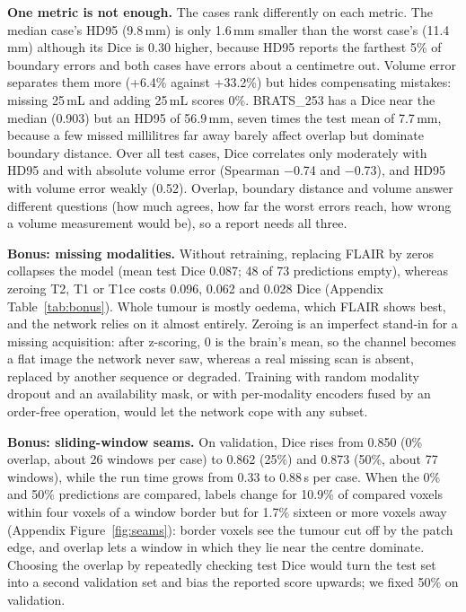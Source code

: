 \documentclass[11pt,a4paper]{article}
\begin{document}
\textbf{One metric is not enough.} The cases rank differently on each metric. The median case's HD95 (9.8\,mm) is only 1.6\,mm
smaller than the worst case's (11.4\,mm) although its Dice is 0.30 higher, because HD95 reports the farthest 5\% of
boundary errors and both cases have errors about a centimetre out. Volume error separates them more (+6.4\% against
+33.2\%) but hides compensating mistakes: missing 25\,mL and adding 25\,mL scores 0\%. BRATS\_253 has a Dice near the
median (0.903) but an HD95 of 56.9\,mm, seven times the test mean of 7.7\,mm, because a few missed millilitres far away
barely affect overlap but dominate boundary distance. Over all
test cases, Dice correlates only moderately with HD95 and with absolute volume error (Spearman $-$0.74 and $-$0.73), and
HD95 with volume error weakly (0.52). Overlap, boundary distance and volume answer different questions (how much agrees,
how far the worst errors reach, how wrong a volume measurement would be), so a report needs all three.

\textbf{Bonus: missing modalities.} Without retraining, replacing FLAIR by zeros collapses the model (mean test Dice
0.087; 48 of 73 predictions empty), whereas zeroing T2, T1 or T1ce costs 0.096, 0.062 and 0.028 Dice
(Appendix Table~\ref{tab:bonus}). Whole tumour is mostly oedema, which FLAIR shows best, and the network relies on it
almost entirely. Zeroing is an imperfect stand-in for a missing acquisition: after z-scoring, 0 is the brain's mean, so
the channel becomes a flat image the network never saw, whereas a real missing scan is absent, replaced by another
sequence or degraded. Training with random modality dropout and an availability mask, or with per-modality encoders
fused by an order-free operation, would let the network cope with any subset.

\textbf{Bonus: sliding-window seams.} On validation, Dice rises from 0.850 (0\% overlap, about 26 windows per case) to
0.862 (25\%) and 0.873 (50\%, about 77 windows), while the run time grows from 0.33 to 0.88\,s per case. When the 0\% and 50\% predictions are
compared, labels change for 10.9\% of compared voxels within four voxels of a window border but for
1.7\% sixteen or more voxels away (Appendix Figure~\ref{fig:seams}): border voxels see the tumour cut off by
the patch edge, and overlap lets a window in which they lie near the centre dominate. Choosing the overlap by repeatedly
checking test Dice would turn the test set into a second validation set and bias the reported score upwards; we fixed
50\% on validation.
\end{document}

